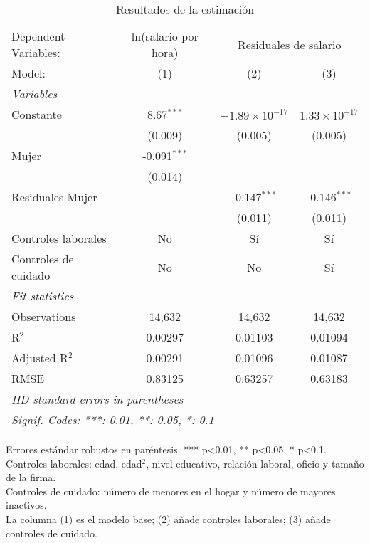 
\begin{table}[htbp]
   \caption{Resultados de la estimación}
   \centering
   \begin{tabular}{lccc}
      \tabularnewline \midrule \midrule
      Dependent Variables: & ln(salario por hora) & \multicolumn{2}{c}{Residuales de salario}\\
      Model:               & (1)            & (2)                     & (3)\\  
      \midrule
      \emph{Variables}\\
      Constante            & 8.67$^{***}$   & $-1.89\times 10^{-17}$  & $1.33\times 10^{-17}$\\    
                           & (0.009)        & (0.005)                 & (0.005)\\   
      Mujer                & -0.091$^{***}$ &                         &   \\   
                           & (0.014)        &                         &   \\   
      Residuales Mujer     &                & -0.147$^{***}$          & -0.146$^{***}$\\   
                           &                & (0.011)                 & (0.011)\\   
      Controles laborales  & No             & Sí                      & Sí\\  
      Controles de cuidado & No             & No                      & Sí\\  
      \midrule
      \emph{Fit statistics}\\
      Observations         & 14,632         & 14,632                  & 14,632\\  
      R$^2$                & 0.00297        & 0.01103                 & 0.01094\\  
      Adjusted R$^2$       & 0.00291        & 0.01096                 & 0.01087\\  
      RMSE                 & 0.83125        & 0.63257                 & 0.63183\\  
      \midrule \midrule
      \multicolumn{4}{l}{\emph{IID standard-errors in parentheses}}\\
      \multicolumn{4}{l}{\emph{Signif. Codes: ***: 0.01, **: 0.05, *: 0.1}}\\
   \end{tabular}
   
   \par \raggedright 
   Errores estándar robustos en paréntesis. *** p<0.01, ** p<0.05, * p<0.1.\\
   Controles laborales: edad, edad$^2$, nivel educativo, relación laboral, oficio y tamaño de la firma.\\
   Controles de cuidado: número de menores en el hogar y número de mayores inactivos.\\
   La columna (1) es el modelo base; (2) añade controles laborales; (3) añade controles de cuidado.
\end{table}


